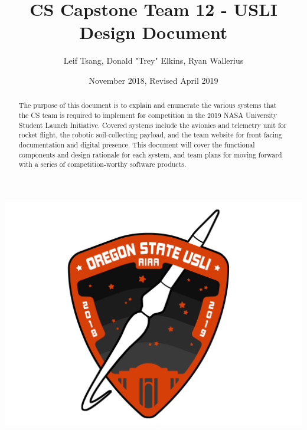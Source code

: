 \documentclass[journal,10pt,draftclsnofoot,onecolumn,compsoc]{IEEEtran} \usepackage[margin=0.75in]{geometry}
\title{CS Capstone Team 12 - USLI\\Design Document}
\author{Leif Tsang, Donald "Trey" Elkins, Ryan Wallerius}
\date{November 2018, Revised April 2019}
\begin{document}
\begin{titlingpage}

\maketitle
\begin{center}

\includegraphics[scale = 0.25]{Figures/2019patch.png}\\[1.0cm]


\begin{abstract}
The purpose of this document is to explain and enumerate the various systems that the CS team is required to implement for competition in the 2019 NASA University Student Launch Initiative. Covered systems include
the avionics and telemetry unit for rocket flight, the robotic soil-collecting payload, and the team website for front facing documentation and digital presence. This document will cover the functional components and design rationale for each system, and team plans for moving forward with a series of competition-worthy software products.
\end{abstract}
\end{center}
\end{titlingpage}

\newpage
\tableofcontents
\newpage
\end{document}
